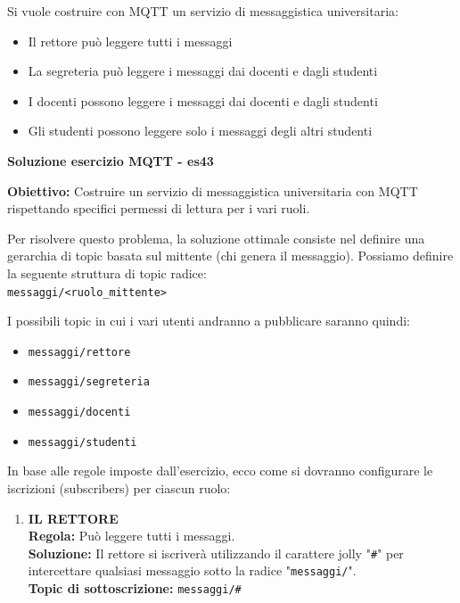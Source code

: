 \documentclass[11pt]{article}
\begin{document}
\begin{tcolorbox}[colback=blue!5!white,colframe=blue!75!black,title=\textbf{DOMANDA}, breakable]
Si vuole costruire con MQTT un servizio di messaggistica universitaria:
\begin{itemize}
    \item Il rettore può leggere tutti i messaggi
    \item La segreteria può leggere i messaggi dai docenti e dagli studenti
    \item I docenti possono leggere i messaggi dai docenti e dagli studenti
    \item Gli studenti possono leggere solo i messaggi degli altri studenti
\end{itemize}
\end{tcolorbox}

\begin{tcolorbox}[colback=green!5!white,colframe=green!75!black,title=\textbf{RISPOSTA}, breakable]
\textbf{Soluzione esercizio MQTT - es43}

\textbf{Obiettivo:} Costruire un servizio di messaggistica universitaria con MQTT rispettando specifici permessi di lettura per i vari ruoli.

Per risolvere questo problema, la soluzione ottimale consiste nel definire una gerarchia di topic basata sul mittente (chi genera il messaggio). Possiamo definire la seguente struttura di topic radice:\\
\texttt{messaggi/<ruolo\_mittente>}

I possibili topic in cui i vari utenti andranno a pubblicare saranno quindi:
\begin{itemize}
    \item \texttt{messaggi/rettore}
    \item \texttt{messaggi/segreteria}
    \item \texttt{messaggi/docenti}
    \item \texttt{messaggi/studenti}
\end{itemize}

In base alle regole imposte dall'esercizio, ecco come si dovranno configurare le iscrizioni (subscribers) per ciascun ruolo:

\begin{enumerate}
    \item \textbf{IL RETTORE}\\
    \textbf{Regola:} Può leggere tutti i messaggi.\\
    \textbf{Soluzione:} Il rettore si iscriverà utilizzando il carattere jolly "\texttt{\#}" per intercettare qualsiasi messaggio sotto la radice "\texttt{messaggi/}".\\
    \textbf{Topic di sottoscrizione:} \texttt{messaggi/\#}


\end{enumerate}
\end{tcolorbox}
\end{document}
